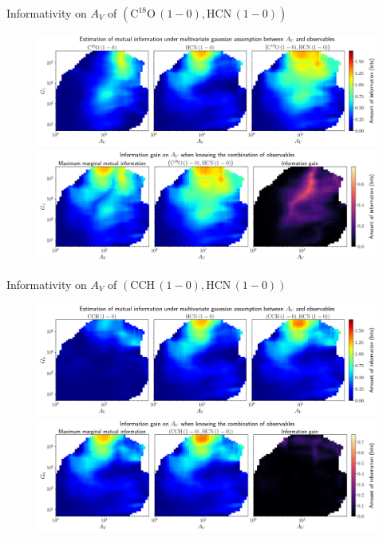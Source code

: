 \documentclass{beamer}
\begin{document}
\begin{frame}{Informativity on $A_V$ of $\left(\mathrm{C^{18}O\,(1-0)},\mathrm{HCN\,(1-0)}\right)$}
    \begin{figure}
        \centering
        \includegraphics[width=0.95\linewidth]{../linearinfo/av__c18o10_hcn10_linearinfo.png}
        \vfill
        \includegraphics[width=0.95\linewidth]{../linearinfo/av__c18o10_hcn10_linearinfo_gain.png}
    \end{figure}
\end{frame}

\begin{frame}{Informativity on $A_V$ of $\left(\mathrm{CCH\,(1-0)},\mathrm{HCN\,(1-0)}\right)$}
    \begin{figure}
        \centering
        \includegraphics[width=0.95\linewidth]{../linearinfo/av__cch10_hcn10_linearinfo.png}
        \vfill
        \includegraphics[width=0.95\linewidth]{../linearinfo/av__cch10_hcn10_linearinfo_gain.png}
    \end{figure}
\end{frame}
\end{document}
